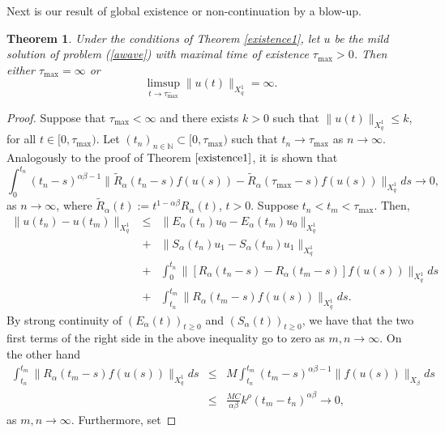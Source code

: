 \documentclass[12pt,reqno]{amsart}
\newtheorem{theorem}{Theorem}
\newcommand{\N}{\mathbb{N}}	%
\begin{document}
Next is our result of global existence or non-continuation by a blow-up. 

\begin{theorem}\label{Blow} Under the conditions of Theorem \ref{existence1}, let $u$ be the mild solution of problem (\ref{awave}) with maximal time of existence $\tau_{\max}>0$. Then either $\tau_{\max}=\infty$ or $$\displaystyle\limsup_{t\rightarrow \tau_{\max}^-}\|u(t)\|_{X^{1}_{q}}=\infty.$$
\end{theorem}
\begin{proof}
	Suppose that $\tau_{\max}<\infty$ and there exists $k>0$ such that $\|u(t)\|_{X^{1}_{q}}\leq k$, for all $t\in [0, \tau_{\max})$. Let $(t_n)_{n\in\N}\subset[0,\tau_{\max})$ such that $t_n\rightarrow \tau_{\max}$ as $n\rightarrow \infty$. Analogously to the proof of Theorem $\ref{existence1}$, it is shown that 	
	$$\int_{0}^{t_n}(t_n - s)^{\alpha\beta-1}\|\tilde{R}_{\alpha}(t_n-s)f(u(s))-\tilde{R}_{\alpha}(\tau_{\max}-s)f(u(s))\|_{X^{1}_{q}}ds\to0,$$
	as $n\rightarrow \infty$, 
	where $\tilde{R}_{\alpha}(t):= t^{1-\alpha\beta}R_{\alpha}(t)$, $t>0$. 		Suppose $t_n<t_m<\tau_{\max}$. Then,
	\begin{eqnarray*}
		\|u(t_n)-u(t_m)\|_{X^{1}_{q}}&\leq& \|E_{\alpha}(t_n)u_0-E_{\alpha}(t_m)u_0\|_{X^{1}_{q}}\\
		&+& \|S_{\alpha}(t_n)u_1-S_{\alpha}(t_m)u_1\|_{X^{1}_{q}}\\                              
		&+&\int_{0}^{t_n}\|[R_{\alpha}(t_n-s)-R_{\alpha}(t_m-s)]f(u(s))\|_{X^{1}_{q}}ds\\
		&+& \int_{t_n}^{t_m}\|R_{\alpha}(t_m-s)f(u(s))\|_{X^{1}_{q}}ds.
	\end{eqnarray*}
	By strong continuity of $(E_{\alpha}(t))_{t\ge0}$ and $(S_{\alpha}(t))_{t\ge0}$, we have that the two first terms of the right side in the above inequality go to zero as $m, n\rightarrow\infty.$ On the other hand
	\begin{eqnarray*}
		\int_{t_n}^{t_m}\|R_{\alpha}(t_m-s)f(u(s))\|_{X^{1}_{q}}ds &\leq& M \int_{t_n}^{t_m}(t_m-s)^{\alpha\beta-1}\|f(u(s))\|_{X_{\beta}}ds\\
		&\leq& \frac{MC}{\alpha\beta}k^{\rho}(t_m-t_n)^{\alpha\beta}\rightarrow 0,
	\end{eqnarray*}
	as $m,n\rightarrow\infty$. Furthermore, set
	

\end{proof}
\end{document}
